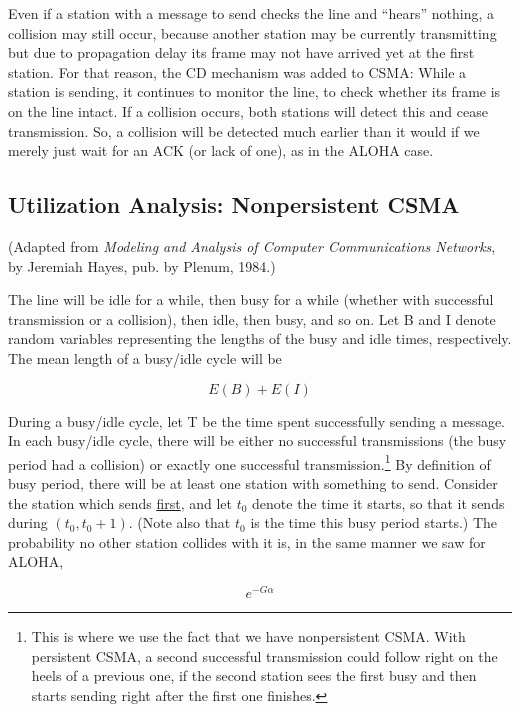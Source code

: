 \documentclass[11pt]{article}
\begin{document}
Even if a station with a message to send checks the line and ``hears''
nothing, a collision may still occur, because another station may be
currently transmitting but due to propagation delay its frame may not
have arrived yet at the first station.  For that reason, the CD
mechanism was added to CSMA: While a station is sending, it continues to
monitor the line, to check whether its frame is on the line intact.  If
a collision occurs, both stations will detect this and cease
transmission.  So, a collision will be detected much earlier than it
would if we merely just wait for an ACK (or lack of one), as in the
ALOHA case.

\subsection{Utilization Analysis:  Nonpersistent CSMA}

(Adapted from {\it Modeling and Analysis of Computer Communications
Networks}, by Jeremiah Hayes, pub. by Plenum, 1984.)

The line will be idle for a while, then busy for a while (whether with
successful transmission or a collision), then idle, then busy, and so
on.  Let B and I denote random variables representing the lengths of the
busy and idle times, respectively.  The mean length of a busy/idle cycle
will be

\begin{equation}
E(B) + E(I)
\end{equation}

During a busy/idle cycle, let T be the time spent successfully
sending a message.  In each busy/idle cycle, there will be either no
successful transmissions (the busy period had a collision) or exactly
one successful transmission.\footnote{This is where we use the fact that
we have nonpersistent CSMA.  With persistent CSMA, a second successful
transmission could follow right on the heels of a previous one, if the
second station sees the first busy and then starts sending right after
the first one finishes.}  By definition of busy period, there will be at
least one station with something to send.  Consider the station which
sends \underline{first}, and let $t_0$ denote the time it starts, so
that it sends during $(t_0,t_0+1)$.  (Note also that $t_0$ is the time
this busy period starts.)  The probability no other station collides
with it is, in the same manner we saw for ALOHA,

\begin{equation}
e^{-G \alpha}
\end{equation}
\end{document}
